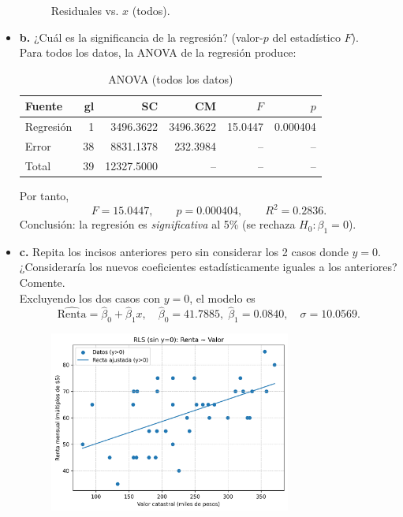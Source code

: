 \documentclass[10pt]{article}
\begin{document}
\begin{itemize}
\begin{figure}[H]
      \caption{Residuales vs. $x$ (todos).}
      \label{fig:cable_full_resid}
    \end{figure}
    \endgroup
    \item \textbf{b.} ¿Cuál es la significancia de la regresión? (valor-$p$ del estadístico $F$).\\
    \begingroup\color{blue}
    Para todos los datos, la ANOVA de la regresión produce:
    \begin{table}[H]
      \centering
      {\color{blue}
      \caption{ANOVA (todos los datos)}
      \label{tab:cable_anova_full}
      \begin{tabular}{|l|r|r|r|r|r|}
        \hline
        \textbf{Fuente} & \textbf{gl} & \textbf{SC} & \textbf{CM} & \textbf{$F$} & \textbf{$p$} \\
        \hline
        Regresión & 1  & 3496.3622 & 3496.3622 & 15.0447 & 0.000404 \\
        Error     & 38 & 8831.1378 &  232.3984 &   --     &   --     \\
        Total     & 39 & 12327.5000 &      --    &   --     &   --     \\
        \hline
      \end{tabular}}
    \end{table}
    Por tanto,
    \[
      F=15.0447,\qquad p=0.000404,\qquad R^2=0.2836.
    \]
    Conclusión: la regresión es \emph{significativa} al 5\% (se rechaza $H_0: \beta_1=0$).
    \endgroup
    \item \textbf{c.} Repita los incisos anteriores pero sin considerar los 2 casos donde $y=0$. ¿Consideraría los nuevos coeficientes estadísticamente iguales a los anteriores? Comente.\\
    \begingroup\color{blue}
    Excluyendo los dos casos con $y=0$, el modelo es
    \[
      \widehat{\text{Renta}} = \hat\beta_0 + \hat\beta_1 x,\quad \hat\beta_0=41.7885,\; \hat\beta_1=0.0840,\quad \sigma=10.0569.
    \]
    \begin{figure}[H]
      \centering
      \includegraphics[width=0.75\textwidth]{../plots/python/ejercicio4/nz_scatter_line.png}

\end{figure}
\end{itemize}
\end{document}
